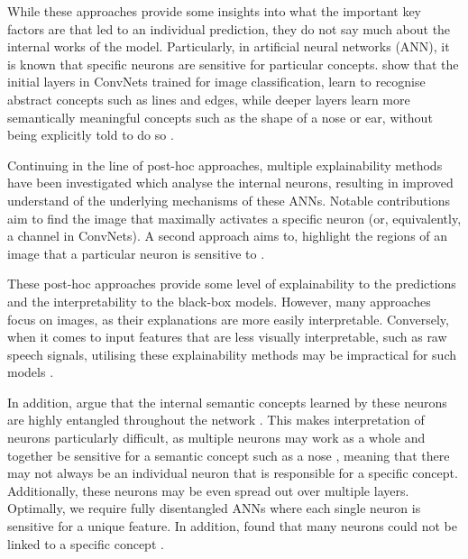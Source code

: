 While these approaches provide some insights into what the important key factors are that led to an individual prediction, they do not say much about the internal works of the model. Particularly, in artificial neural networks (ANN), it is known that specific neurons are sensitive for particular concepts. \citeauthor{zeilerVisualizingUnderstandingConvolutional2013} show that the initial layers in ConvNets trained for image classification, learn to recognise abstract concepts such as lines and edges, while deeper layers learn more semantically meaningful concepts such as the shape of a nose or ear, without being explicitly told to do so \citep{zeilerVisualizingUnderstandingConvolutional2013}.


Continuing in the line of post-hoc approaches, multiple explainability methods have been investigated which analyse the internal neurons, resulting in improved understand of the underlying mechanisms of these ANNs. Notable contributions aim to find the image that maximally activates a specific neuron \citep{simonyanDeepConvolutionalNetworks2014} (or, equivalently, a channel in ConvNets). A second approach aims to, highlight the regions of an image that a particular neuron is sensitive to \citep{zeilerVisualizingUnderstandingConvolutional2013}.

These post-hoc approaches provide some level of explainability to the predictions and the interpretability to the black-box models. However, many approaches focus on images, as their explanations are more easily interpretable. Conversely, when it comes to input features that are less visually interpretable, such as raw speech signals, utilising these explainability methods may be impractical for such models \citep{krugAnalyzingVisualizingDeep2021}.

In addition, \citeauthor{bauNetworkDissectionQuantifying2017} argue that the internal semantic concepts learned by these neurons are highly entangled throughout the network \cite{bauNetworkDissectionQuantifying2017}. This makes interpretation of neurons particularly difficult, as multiple neurons may work as a whole and together be sensitive for a semantic concept such as a nose \citep{molnarInterpretableMachineLearning2022}, meaning that there may not always be an individual neuron that is responsible for a specific concept. Additionally, these neurons may be even spread out over multiple layers.  Optimally, we require fully disentangled ANNs where each single neuron is sensitive for a unique feature. In addition, \citeauthor{bauNetworkDissectionQuantifying2017} found that many neurons could not be linked to a specific concept \citep{molnarInterpretableMachineLearning2022}.

